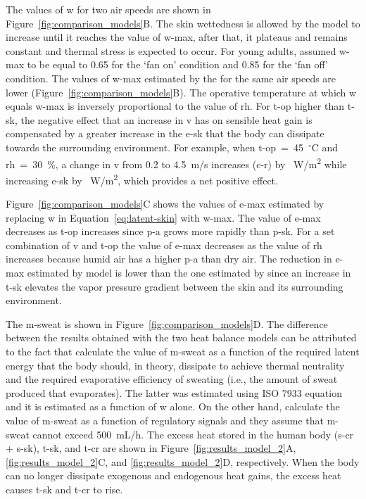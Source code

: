 The values of \ac{w} for two air speeds are shown in Figure~\ref{fig:comparison_models}B\@.
The skin wettedness is allowed by the model to increase until it reaches the value of \ac{w-max}, after that, it plateaus and remains constant and thermal stress is expected to occur.
For young adults,  assumed \ac{w-max} to be equal to 0.65 for the `fan on' condition and 0.85 for the `fan off' condition.
The values of \ac{w-max} estimated by the  for the same air speeds are lower (Figure~\ref{fig:comparison_models}B).
The operative temperature at which \ac{w} equals \ac{w-max} is inversely proportional to the value of \ac{rh}.
For \ac{t-op} higher than \ac{t-sk}, the negative effect that an increase in \ac{v} has on sensible heat gain is compensated by a greater increase in the \acf{e-sk} that the body can dissipate towards the surrounding environment.
For example, when \ac{t-op}~=~45~$^{\circ}$C and \ac{rh}~=~30~\%, a change in \ac{v} from 0.2 to 4.5~m/s increases (\acs{c-r}) by ~W/m\textsuperscript{2} while increasing \ac{e-sk} by ~W/m\textsuperscript{2}, which provides a net positive effect.

Figure~\ref{fig:comparison_models}C shows the values of \ac{e-max} estimated by replacing \ac{w} in Equation~\ref{eq:latent-skin} with \ac{w-max}.
The value of \ac{e-max} decreases as \ac{t-op} increases since \ac{p-a} grows more rapidly than \ac{p-sk}.
For a set combination of \ac{v} and \ac{t-op} the value of \ac{e-max} decreases as the value of \ac{rh} increases because humid air has a higher \ac{p-a} than dry air.
The reduction in \ac{e-max} estimated by  model is lower than the one estimated by  since an increase in \ac{t-sk} elevates the vapor pressure gradient between the skin and its surrounding environment.

The \acf{m-sweat} is shown in Figure~\ref{fig:comparison_models}D\@.
The difference between the results obtained with the two heat balance models can be attributed to the fact that \citeauthor{Jay2015} calculate the value of \ac{m-sweat} as a function of the required latent energy that the body should, in theory, dissipate to achieve thermal neutrality and the required evaporative efficiency of sweating (i.e., the amount of sweat produced that evaporates).
The latter was estimated using ISO 7933 equation and it is estimated as a function of \ac{w} alone.
On the other hand, \citeauthor{GaggeSET} calculate the value of \ac{m-sweat} as a function of regulatory signals and they assume that \ac{m-sweat} cannot exceed 500~mL/h.
The excess heat stored in the human body (\acs{s-cr} + \acs{s-sk}), \ac{t-sk}, and \ac{t-cr} are shown in Figure~\ref{fig:results_model_2}A, \ref{fig:results_model_2}C, and \ref{fig:results_model_2}D, respectively.
When the body can no longer dissipate exogenous and endogenous heat gains, the excess heat causes \ac{t-sk} and \ac{t-cr} to rise.

